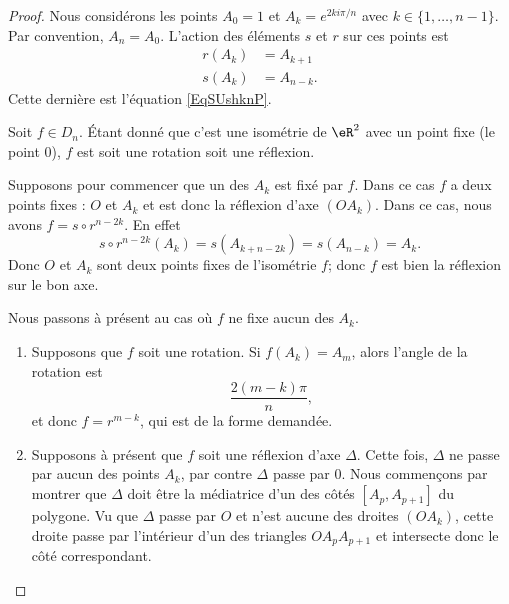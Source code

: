 \begin{proof}
    Nous considérons les points \( A_0=1\) et \( A_k= e^{2ki\pi/n}\) avec \( k\in\{ 1,\ldots, n-1 \}\). Par convention, \( A_n=A_0\). L'action des éléments \( s\) et \( r\) sur ces points est
    \begin{subequations}
        \begin{align}
            r(A_k)&=A_{k+1}\\
            s(A_k)&=A_{n-k}.
        \end{align}
    \end{subequations}
    Cette dernière est l'équation \eqref{EqSUshknP}.

    Soit \( f\in D_n\). Étant donné que c'est une isométrie de \( \eR^2\) avec un point fixe (le point \( 0\)), \( f\) est soit une rotation soit une réflexion.

    Supposons pour commencer que un des \( A_k\) est fixé par \( f\). Dans ce cas \( f\) a deux points fixes : \( O\) et \( A_k\) et est donc la réflexion d'axe \( (OA_k)\). Dans ce cas, nous avons \( f=s\circ r^{n-2k}\). En effet
    \begin{equation}
        s\circ r^{n-2k}(A_k)=s(A_{k+n-2k})=s(A_{n-k})=A_k.
    \end{equation}
    Donc \( O\) et \( A_k\) sont deux points fixes de l'isométrie \( f\); donc \( f\) est bien la réflexion sur le bon axe.

    Nous passons à présent au cas où \( f\) ne fixe aucun des \( A_k\).
    \begin{enumerate}
        \item
            Supposons que \( f\) soit une rotation. Si \( f(A_k)=A_m\), alors l'angle de la rotation est
            \begin{equation}
                \frac{ 2(m-k)\pi }{ n },
            \end{equation}
            et donc \( f=r^{m-k}\), qui est de la forme demandée.
        \item
            Supposons à présent que \( f\) soit une réflexion d'axe \( \Delta\). Cette fois, \( \Delta\) ne passe par aucun des points \( A_k\), par contre \( \Delta\) passe par \( 0\). Nous commençons par montrer que \( \Delta\) doit être la médiatrice d'un des côtés \( [A_p,A_{p+1}]\) du polygone. Vu que \( \Delta\) passe par \( O\) et n'est aucune des droites \( (OA_k)\), cette droite passe par l'intérieur d'un des triangles \( OA_pA_{p+1}\) et intersecte donc le côté correspondant.


\end{enumerate}
\end{proof}
